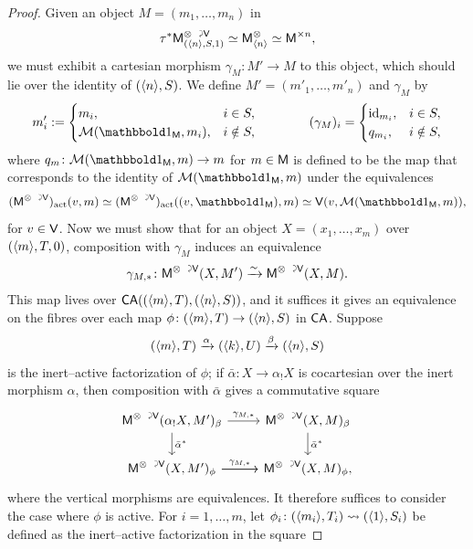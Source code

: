 \documentclass[a4paper,11pt]{article}
\begin{document}
\begin{proof}
  Given an object $M = (m_{1},\ldots,m_{n})$ in
  \[ \tau^{*}\utract{M}{V}_{(\angled{n}, S, 1)} \simeq \uM^{\otimes}_{\angled{n}} \simeq \uM^{\times n},\]
  we must exhibit a cartesian morphism $\gamma_{M} \colon M' \to M$ to
  this object, which should lie over the identity of $(\langle n \rangle,
  S)$. We define $M' = (m'_{1},\ldots,m'_{n})$  and $\gamma_{M}$ by
  \[ m'_{i} :=
    \begin{cases}
      m_{i}, & i \in S, \\
      \nM(\bbone_{\uM}, m_{i}), & i \notin S,
    \end{cases}
    \qquad\qquad (\gamma_{M})_{i} =
    \begin{cases}
      \id_{m_{i}}, & i \in S, \\
      q_{m_{i}}, & i \notin S,
    \end{cases}
  \]
  where  $q_{m} \colon \nM(\bbone_{\uM}, m) \to m$ for $m \in
  \textup{\textsf{M}}$ is defined to be the map that corresponds to the identity of $\nM(\bbone_{\uM}, m)$ under the equivalences
  \[
    (\utract{M}{V})_{\act}(v, m) \simeq (\utract{M}{V})_{\act}((v, \bbone_{\uM}), m) \simeq \oV(v, \nM(\bbone_{\uM}, m)),
  \]
  for $v \in \textup{\textsf{V}}$. Now we must show that for an object $X = (x_{1},\ldots,x_{m})$ over $(\langle m \rangle, T, 0)$, composition with $\gamma_{M}$ induces an equivalence
  \[ \gamma_{M,*} \colon \utract{M}{V}(X, M') \isoto \utract{M}{V}(X, M).\]
  This map lives over $\textup{\textsf{CA}}((\langle m \rangle, T), (\langle n \rangle, S))$, and it suffices it gives an equivalence on the fibres over each map $\phi \colon (\angled{m}, T) \to (\angled{n}, S)$ in $\textup{\textsf{CA}}$. Suppose
  \[ (\angled{m}, T) \xto{\alpha} (\angled{k}, U) \xto{\beta} (\angled{n}, S)\]
  is the inert--active factorization of $\phi$; if $\bar{\alpha} \colon X \to \alpha_{!}X$ is cocartesian over the inert morphism $\alpha$, then composition with $\bar{\alpha}$ gives a commutative square
  \[
    \begin{tikzcd}
      \utract{M}{V}(\alpha_{!}X, M')_{\beta} \ar[r, "\gamma_{M,*}"] \ar[d, "\bar{\alpha}^{*}"]  & \utract{M}{V}(X, M)_{\beta} \ar[d, "\bar{\alpha}^{*}"] \\
      \utract{M}{V}(X, M')_{\phi} \ar[r, "\gamma_{M,*}"] \ar[r] &  \utract{M}{V}(X, M)_{\phi},
    \end{tikzcd}
  \]
  where the vertical morphisms are equivalences. It therefore suffices to consider the case where $\phi$ is active. For $i = 1,\ldots,m$, let $\phi_{i} \colon (\langle m_{i} \rangle, T_{i}) \rightsquigarrow (\langle 1 \rangle, S_{i})$ be defined as the inert--active factorization in the square

\end{proof}
\end{document}
